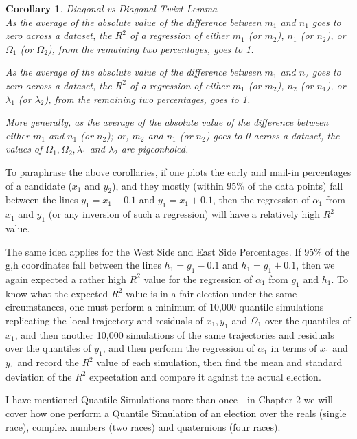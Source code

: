 \documentclass[preprint,13pt]{elsarticle}
\newtheorem{corollary}{Corollary}[theorem]
\begin{document}
\begin{corollary}{Diagonal vs Diagonal Twixt Lemma}\\
As the average of the absolute value of the difference between $m_{1}$ and $n_{1}$ goes to zero across a dataset, the $R^2$ of a regression of either $m_{1}$ (or $m_{2}$), $n_{1}$ (or $n_{2}$), or $\Omega_{1}$ (or $\Omega_{2}$), from the remaining two percentages, goes to 1.

As the average of the absolute value of the difference between $m_{1}$ and $n_{2}$ goes to zero across a dataset, the $R^2$ of a regression of either $m_{1}$ (or $m_{2}$), $n_{2}$ (or $n_{1}$), or $\lambda_{1}$ (or $\lambda_{2}$), from the remaining two percentages, goes to 1.

More generally, as the average of the absolute value of the difference between either $m_{1}$ and $n_{1}$ (or $n_{2}$); or, $m_{2}$ and $n_{1}$ (or $n_{2}$) goes to 0 across a dataset, the values of $\Omega_{1},\Omega_{2}, \lambda_{1}$ and $\lambda_{2}$ are pigeonholed.
\end{corollary}

To paraphrase the above corollaries, if one plots the early and mail-in percentages of a candidate ($x_{1}$ and $y_{2}$), and they mostly (within 95\% of the data points) fall between the lines $y_{1}=x_{1}-0.1$ and $y_{1}=x_{1}+0.1$, then the regression of $\alpha_{1}$ from $x_{1}$ and $y_{1}$ (or any inversion of such a regression) will have a relatively high $R^2$ value.

The same idea applies for the West Side and East Side Percentages. If 95\% of the g,h coordinates fall between the lines $h_{1}=g_{1}-0.1$ and $h_{1}=g_{1}+0.1$, then we again expected a rather high $R^2$ value for the regression of $\alpha_{1}$ from $g_{1}$ and $h_{1}$.
\newpage
To know what the expected $R^2$ value is in a fair election under the same circumstances, one must perform a minimum of 10,000 quantile simulations replicating the local trajectory and residuals of $x_{1}, y_{1}$ and $\Omega_{1}$ over the quantiles of $x_{1}$, and then another 10,000 simulations of the same trajectories and residuals over the quantiles of $y_{1}$, and then perform the regression of $\alpha_{1}$ in terms of $x_{1}$ and $y_{1}$ and record the $R^2$ value of each simulation, then find the mean and standard deviation of the $R^2$ expectation and compare it against the actual election.

I have mentioned Quantile Simulations more than once---in Chapter 2 we will cover how one perform a Quantile Simulation of an election over the reals (single race), complex numbers (two races) and quaternions (four races).
\end{document}
